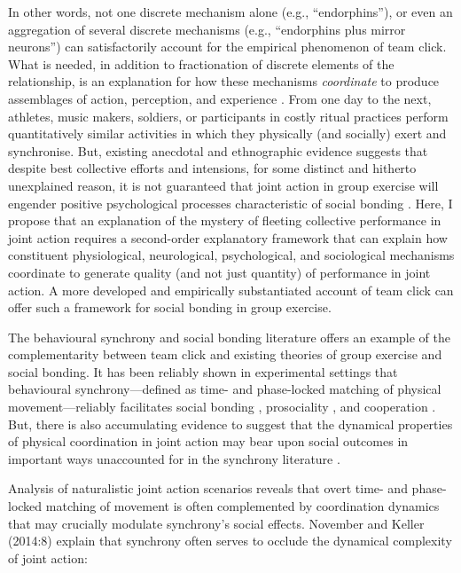 In other words, not one discrete mechanism alone (e.g., ``endorphins''), or even an aggregation of several discrete mechanisms (e.g., ``endorphins plus mirror neurons'') can satisfactorily account for the empirical phenomenon of team click.  What is needed, in addition to fractionation of discrete elements of the relationship, is an explanation for how these mechanisms \textit{coordinate} to produce assemblages of action, perception, and experience \citep{Kelso2013}.  From one day to the next, athletes, music makers, soldiers, or participants in costly ritual practices perform quantitatively similar activities in which they physically (and socially) exert and synchronise.  But, existing anecdotal and ethnographic evidence suggests that despite best collective efforts and intensions, for some distinct and hitherto unexplained reason, it is not guaranteed that joint action in group exercise will engender positive psychological processes characteristic of social bonding \citep[e.g.,][]{King2011}.  Here, I propose that an explanation of the mystery of fleeting collective performance in joint action requires a second-order explanatory framework that can explain how constituent physiological, neurological, psychological, and sociological mechanisms coordinate to generate quality (and not just quantity) of performance in joint action. A more developed and empirically substantiated account of team click can offer such a framework for social bonding in group exercise.

The behavioural synchrony and social bonding literature offers an example of the complementarity between team click and existing theories of group exercise and social bonding.  It has been reliably shown in experimental settings that behavioural synchrony—defined as time- and phase-locked matching of physical movement—reliably facilitates social bonding \citep{Launay2016}, prosociality \citep{Kirschner2010}, and cooperation \citep{Reddish2013}.  But, there is also accumulating evidence to suggest that the dynamical properties of physical coordination in joint action may bear upon social outcomes in important ways unaccounted for in the synchrony literature \citep{Fusaroli2014}.

Analysis of naturalistic joint action scenarios reveals that overt time- and phase-locked matching of movement is often complemented by coordination dynamics that may crucially modulate synchrony's social effects.  November and Keller (2014:8) explain that synchrony often serves to occlude the dynamical complexity of joint action:

